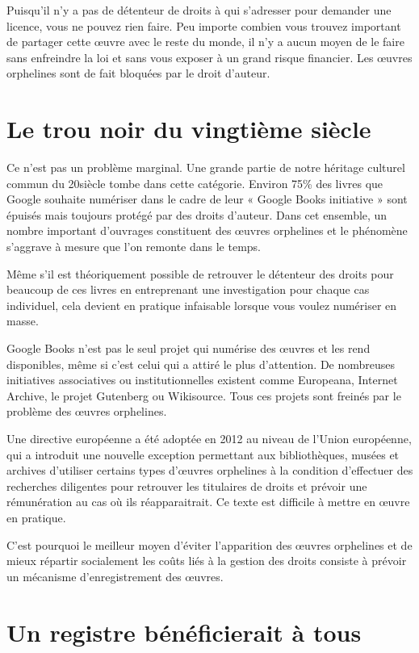 Puisqu’il n’y a pas de détenteur de droits à qui s’adresser pour demander une licence, vous ne
pouvez rien faire. Peu importe combien vous trouvez important de partager cette œuvre avec le reste
du monde, il n’y a aucun moyen de le faire sans enfreindre la loi et sans vous exposer à un grand
risque financier. Les œuvres orphelines sont de fait bloquées par le droit d’auteur.

\section{Le trou noir du vingtième siècle}

Ce n’est pas un problème marginal. Une grande partie de notre héritage culturel commun du 20siècle tombe dans cette catégorie. Environ 75\% des livres que Google souhaite numériser dans le cadre de leur « Google Books initiative » sont épuisés mais toujours protégé par des droits d’auteur. Dans cet ensemble, un nombre important d'ouvrages constituent des œuvres orphelines et le phénomène s'aggrave à mesure que l'on remonte dans le temps.

Même s’il est théoriquement possible de retrouver le détenteur des droits pour beaucoup de ces
livres en entreprenant une investigation pour chaque cas individuel, cela devient en pratique
infaisable lorsque vous voulez numériser en masse.

Google Books n’est pas le seul projet qui numérise des œuvres et les rend disponibles, même si c’est celui qui a attiré le plus d’attention. De nombreuses initiatives associatives ou institutionnelles existent comme Europeana, Internet Archive, le projet Gutenberg ou Wikisource. Tous ces projets sont freinés par le problème des œuvres orphelines.

Une directive européenne a été adoptée en 2012 au niveau de l'Union européenne, qui a introduit une nouvelle exception permettant aux bibliothèques, musées et archives d'utiliser certains types d'œuvres orphelines à la condition d'effectuer des recherches diligentes pour retrouver les titulaires de droits et prévoir une rémunération au cas où ils réapparaitrait. Ce texte est difficile à mettre en œuvre en pratique. 

C'est pourquoi le meilleur moyen d'éviter l'apparition des œuvres orphelines et de mieux répartir socialement les coûts liés à la gestion des droits consiste à prévoir un mécanisme d'enregistrement des œuvres.  

\section{Un registre bénéficierait à tous}

